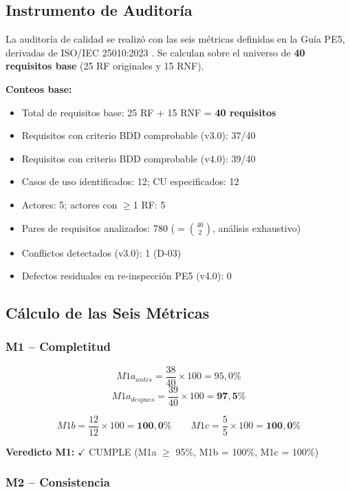 \documentclass[11pt,a4paper]{article}
\begin{document}
\subsection{Instrumento de Auditoría}

La auditoría de calidad se realizó con las seis métricas definidas en la Guía PE5, derivadas de ISO/IEC 25010:2023 \cite{iso25010}. Se calculan sobre el universo de \textbf{40 requisitos base} (25 RF originales y 15 RNF).

\textbf{Conteos base:}
\begin{itemize}
  \item Total de requisitos base: 25 RF + 15 RNF = \textbf{40 requisitos}
  \item Requisitos con criterio BDD comprobable (v3.0): 37/40
  \item Requisitos con criterio BDD comprobable (v4.0): 39/40
  \item Casos de uso identificados: 12; CU especificados: 12
  \item Actores: 5; actores con $\geq$1 RF: 5
  \item Pares de requisitos analizados: 780 ($=\binom{40}{2}$, análisis exhaustivo)
  \item Conflictos detectados (v3.0): 1 (D-03)
  \item Defectos residuales en re-inspección PE5 (v4.0): 0
\end{itemize}

\subsection{Cálculo de las Seis Métricas}

\subsubsection{M1 -- Completitud}

\[ M1a_{antes} = \frac{38}{40} \times 100 = 95{,}0\% \]
\[ M1a_{despues} = \frac{39}{40} \times 100 = \mathbf{97{,}5\%} \]

\[ M1b = \frac{12}{12} \times 100 = \mathbf{100{,}0\%} \qquad M1c = \frac{5}{5} \times 100 = \mathbf{100{,}0\%} \]

\textbf{Veredicto M1:} $\checkmark$ CUMPLE (M1a $\geq$ 95\%, M1b = 100\%, M1c = 100\%)

\subsubsection{M2 -- Consistencia}
\end{document}

